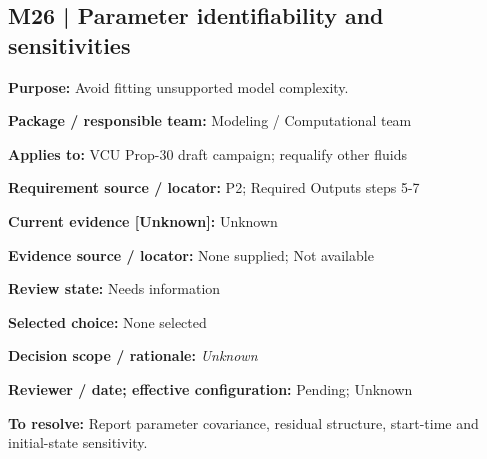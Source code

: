 \documentclass[11pt]{article}
\begin{document}
\par\noindent\begin{minipage}{\textwidth}\small\setlength{\parskip}{2pt}
\subsection*{M26 | Parameter identifiability and sensitivities}
\textbf{Purpose:} Avoid fitting unsupported model complexity.\par
\textbf{Package / responsible team:} Modeling / Computational team\par
\textbf{Applies to:} VCU Prop-30 draft campaign; requalify other fluids\par
\textbf{Requirement source / locator:} P2; Required Outputs steps 5-7\par
\textbf{Current evidence [Unknown]:} Unknown\par
\textbf{Evidence source / locator:} None supplied; Not available\par
\textbf{Review state:} Needs information\par
\textbf{Selected choice:} None selected\par
\textbf{Decision scope / rationale:} \textit{Unknown}\par
\textbf{Reviewer / date; effective configuration:} Pending; Unknown\par
\textbf{To resolve:} Report parameter covariance, residual structure, start-time and initial-state sensitivity.\par
\end{minipage}\par\vspace{5pt}
\end{document}
